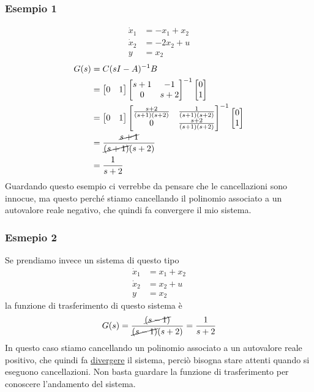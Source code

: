 \documentclass{article}
\numberwithin{equation}{subsection}
\begin{document}
\subsubsection{Esempio 1}
\begin{align*}
    \dot x_1 &= -x_1 + x_2\\
    \dot x_2 &= -2x_2 + u\\
    y &= x_2
\end{align*}
\begin{align*}
    G(s)    &= C(sI-A)^{-1} B \\
            &=  \begin{bmatrix}
                0 & 1
                \end{bmatrix}
                \begin{bmatrix}
                    s+1 & -1\\
                    0   & s+2 
                \end{bmatrix}^{-1}
                \begin{bmatrix}
                    0 \\ 1
                \end{bmatrix}\\
            &= \begin{bmatrix}
                0 & 1
                \end{bmatrix}
                \begin{bmatrix}
                    \frac{s+2}{(s+1)(s+2)} & \frac{1}{(s+1)(s+2)}\\
                    0   & \frac{s+2}{(s+1)(s+2)}
                \end{bmatrix}^{-1}
                \begin{bmatrix}
                    0 \\ 1
                \end{bmatrix}
            \\
            &= \frac{\cancel{s+1}}{\cancel{(s+1)}(s+2)}\\
            &= \frac{1}{s+2}
\end{align*}
Guardando questo esempio ci verrebbe da pensare che le cancellazioni sono innocue, ma questo perché stiamo cancellando il polinomio associato a un autovalore reale negativo, che quindi fa convergere il mio sistema.

\subsubsection{Esmepio 2}
Se prendiamo invece un sistema di questo tipo
\begin{align*}
    \dot x_1 &= x_1 + x_2\\
    \dot x_2 &= x_2 + u\\
    y &= x_2
\end{align*}
la funzione di trasferimento di questo sistema è 
\[
    G(s) = \frac{\cancel{(s-1)}}{\cancel{(s-1)}(s+2)} = \frac{1}{s+2}
\]
In questo caso stiamo cancellando un polinomio associato a un autovalore reale positivo, che quindi fa \underline{divergere} il sistema, perciò bisogna stare attenti quando si eseguono cancellazioni. Non basta guardare la funzione di trasferimento per conoscere l'andamento del sistema.
\end{document}
